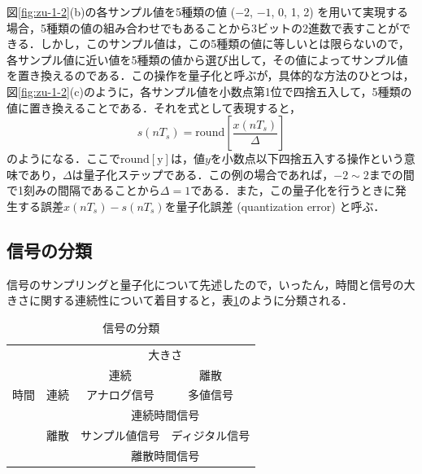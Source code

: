 
図\ref{fig:zu-1-2}(b)の各サンプル値を5種類の値 ($-2$, $-1$, 0, 1, 2) を用いて実現する場合，5種類の値の組み合わせでもあることから3ビットの2進数で表すことができる．しかし，このサンプル値は，この5種類の値に等しいとは限らないので，各サンプル値に近い値を5種類の値から選び出して，その値によってサンプル値を置き換えるのである．この操作を量子化と呼ぶが，具体的な方法のひとつは，図\ref{fig:zu-1-2}(c)のように，各サンプル値を小数点第1位で四捨五入して，5種類の値に置き換えることである．それを式として表現すると，
\begin{equation}
s(nT_s)=\mathrm{round} \left [ \frac{x(nT_s)}{\Delta}\right ]
\end{equation}
のようになる．ここで$\mathrm{round[y]}$は，値$y$を小数点以下四捨五入する操作という意味であり，$\Delta$は量子化ステップである．この例の場合であれば，$-2 \sim 2$までの間で1刻みの間隔であることから$\Delta=1$である．また，この量子化を行うときに発生する誤差$x(nT_s) - s(nT_s)$を量子化誤差 (quantization error) と呼ぶ．

\subsection{信号の分類}

信号のサンプリングと量子化について先述したので，いったん，時間と信号の大きさに関する連続性について着目すると，表\ref{table:table-1-2}のように分類される．

\begin{table}[t]
\caption{信号の分類}
\label{table:table-1-2}
\begin{center}
\begin{tabular}{|c|c|c|c|}
\hline
 \multicolumn{1}{|c}{} & \multicolumn{1}{c}{} & \multicolumn{2}{|c|}{大きさ} \\ \cline{3-4}
 \multicolumn{1}{|c}{} & \multicolumn{1}{c|}{} & 連続 & 離散 \\
\hline
 時間 & 連続 & アナログ信号 & 多値信号 \\ \cline{3-4}
 & & \multicolumn{2}{|c|}{連続時間信号} \\ \cline {2-4}
 & 離散 & サンプル値信号 & ディジタル信号 \\ \cline {3-4}
 &  & \multicolumn{2}{|c|}{離散時間信号} \\ \hline
\end{tabular}
\end{center}
\end{table}

